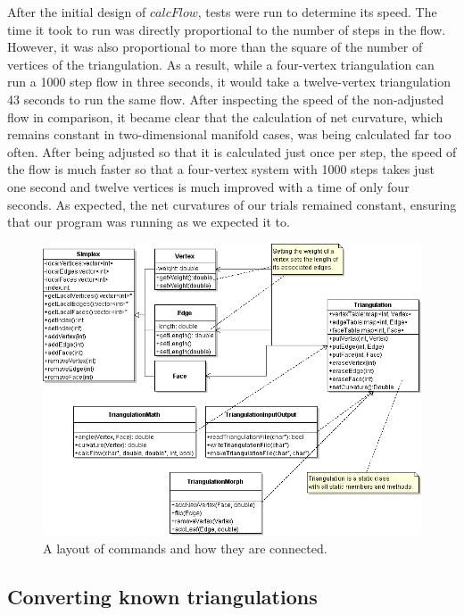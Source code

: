 \documentclass[12pt]{article}
\begin{document}
\noindent After the initial design of $calcFlow$, tests were run to determine its speed. The time it took to run was directly proportional to the number of steps in the flow. However, it was also proportional to more than the square of the number of vertices of the triangulation. As a result, while a four-vertex triangulation can run a 1000 step flow in three seconds, it would take a twelve-vertex triangulation 43 seconds to run the same flow. After inspecting the speed of the non-adjusted flow in comparison, it became clear that the calculation of net curvature, which remains constant in two-dimensional manifold cases, was being calculated far too often. After being adjusted so that it is calculated just once per step, the speed of the flow is much faster so that a four-vertex system with 1000 steps takes just one second and twelve vertices is much improved with a time of only four seconds. As expected, the net curvatures of our trials remained constant, ensuring that our program was running as we expected it to.\newline
  
\begin{figure}
\includegraphics[scale = 0.5]{triangulationUML.png}
\caption{A layout of commands and how they are connected.}
\label{triUML}
\end{figure}
  
\subsection{Converting known triangulations}
\maketitle
\end{document}
